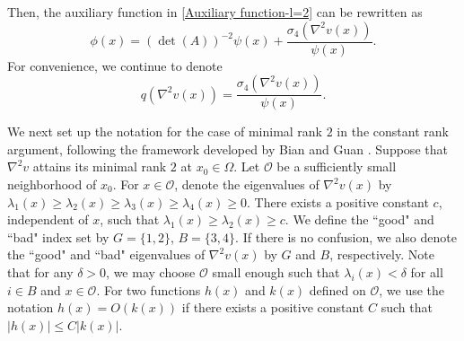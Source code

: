 \documentclass[11pt]{amsart}
\numberwithin{theorem}{section}
\numberwithin{equation}{section}
\begin{document}
Then, the auxiliary function in \eqref{Auxiliary function-l=2} can be rewritten as
\begin{equation}\label{Equality-phi}
\phi(x)=(\det(A))^{-2}\psi(x)+\frac{\sigma_4(\nabla^2v(x))}{\psi(x)}.
\end{equation}
For convenience, we continue to denote
\begin{equation}\label{q(D^2v(x))-new}
q(\nabla^2v(x))=\frac{\sigma_4(\nabla^2v(x))}{\psi(x)}.
\end{equation}

We next set up the notation for the case of minimal rank $2$ in the constant rank argument, following the framework developed by Bian and Guan \cite{Bian-Guan2009}. Suppose that $\nabla^2v$ attains its minimal rank $2$ at $x_0\in\Omega$. Let $\mathcal{O}$ be a sufficiently small neighborhood of $x_0$. For $x\in\mathcal{O}$, denote the eigenvalues of $\nabla^2v(x)$ by $\lambda_1(x)\geq\lambda_2(x)\geq\lambda_3(x)\geq\lambda_4(x)\geq 0$. There exists a positive constant $c$, independent of $x$, such that $\lambda_1(x)\geq\lambda_2(x)\geq c$. We define the “good" and “bad" index set by $G=\{1,2\}$, $B=\{3,4\}$. If there is no confusion, we also denote the “good" and “bad" eigenvalues of $\nabla^2v(x)$ by $G$ and $B$, respectively. Note that for any $\delta>0$, we may choose $\mathcal{O}$ small enough such that $\lambda_i(x)<\delta$ for all $i\in B$ and $x\in\mathcal{O}$. For two functions $h(x)$ and $k(x)$ defined on $\mathcal{O}$, we use the notation $h(x)=O(k(x))$ if there exists a positive constant $C$ such that $|h(x)|\leq C|k(x)|$.
\end{document}
